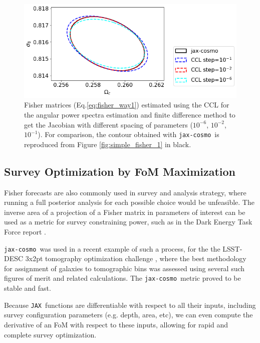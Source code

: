 \documentclass[twocolumn,twocolappendix,nofootinbib,iop]{openjournal}
\newcommand{\FrL}[1]{{\color{cyan}FL: #1}}
\newcommand{\jaxcosmo}{\texttt{jax-cosmo}}
\newcommand{\jax}{\texttt{JAX}}
\begin{document}
\begin{figure}
    \centering
    \includegraphics[width=\columnwidth]{figures/simple_fisher_2.png}
    \caption{Fisher matrices (Eq.\ref{eq:fisher_way1}) estimated using the CCL for the angular power spectra estimation and finite difference method to get the Jacobian  with different spacing of parameters ($10^{-6}$, $10^{-2}$, $10^{-1}$). For comparison, the contour obtained with \jaxcosmo\ is reproduced from Figure \ref{fig:simple_fisher_1} in black.} 
    \label{fig:simple_fisher_2}
\end{figure}

%
\subsection{Survey Optimization by FoM Maximization}
\label{sec-FOM-optimisation}
Fisher forecasts are also commonly used in survey and analysis strategy, where running a full posterior analysis for each possible choice would be unfeasible. The inverse area of a projection of a Fisher matrix in parameters of interest can be used as a metric for survey constraining power, such as in the Dark Energy Task Force report \citep{2006astro.ph..9591A}.

\jaxcosmo\ was used in a recent example of such a process, for the  the LSST-DESC 3x2pt tomography optimization challenge \citep{2021OJAp....4E..13Z}, where the best methodology for assignment of galaxies to tomographic bins was assessed using several such figures of merit and related calculations. The \jaxcosmo\ metric proved to be stable and fast.

Because \jax\ functions are differentiable with respect to all their inputs, including survey configuration parameters (e.g. depth, area, etc), we can even compute the derivative of an FoM with respect to these inputs, allowing for rapid and complete survey optimization.
\end{document}
